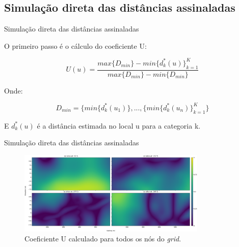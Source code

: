\documentclass[aspectratio=169]{beamer}
\begin{document}
\subsection{Simulação direta das distâncias assinaladas}

\begin{frame}{Simulação direta das distâncias assinaladas}

O primeiro passo é o cálculo do coeficiente U:

\begin{equation}\label{u_eq}
U(u)=\frac{max\{D_{min}\}-min\{d^*_k(u)\}^K_{k=1}}{max\{D_{min}\}-min\{D_{min}\}}
\end{equation}

Onde:

\begin{equation}
D_{min}=\{min\{d^*_k(u_1)\},...,\{min\{d^*_k(u_n)\}^K_{k=1}\}
\end{equation}

E $d^*_k(u)$ é a distância estimada no local u para a categoria k.


\end{frame}

\begin{frame}{Simulação direta das distâncias assinaladas}
	\begin{figure}[H]
		\caption{\label{u_fig}Coeficiente U calculado para todos os nós do \textit{grid}.}
		\begin{center}
			\includegraphics[width=0.8\textwidth]{capitulo_2/u_coef.png}
		\end{center}
	\end{figure}
\end{frame}
\end{document}
